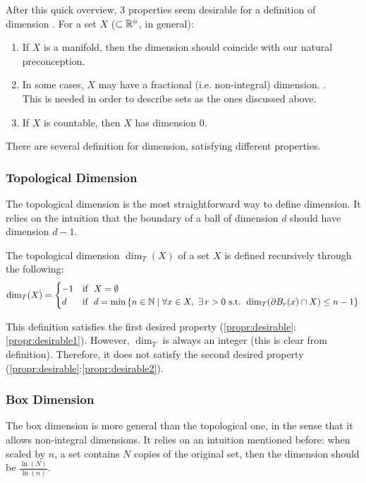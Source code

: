 After this quick overview, 3 properties seem desirable for a definition of dimension \cite{Pollicott_LFDT}.
For a set $X$ ($\subset \mathbb{R}^n$, in general):
\begin{enumerate}\label{propr:desirable}
	\item If $X$ is a manifold, then the dimension should coincide with our natural preconception. \label{propr:desirable1}
	\item In some cases, $X$ may have a fractional (i.e. non-integral) dimension. \label{propr:desirable2}.\\
	This is needed in order to describe sets as the ones discussed above.
	\item If $X$ is countable, then $X$ has dimension $0$. \label{propr:desirable3}
\end{enumerate}
There are several definition for dimension, satisfying different properties.

\subsubsection{Topological Dimension}
The topological dimension is the most straightforward way to define dimension.
It relies on the intuition that the boundary of a ball of dimension $d$ should have dimension $d-1$.

\begin{definition}\label{def:topologicalDimension}
	The topological dimension $\dim_T(X)$ of a set $X$ is defined recursively through the following:
	\begin{equation*}
		\dim_T(X) =
		\begin{cases}
			-1 & \text{if } \ X = \emptyset \\
			 d & \text{if } \ d = \min \left\lbrace n \in \mathbb{N} \mid \forall x \in X, \ \exists \, r>0 \text{ s.t. } \dim_T(\partial B_r(x) \cap X) \leq n-1 \right\rbrace
		\end{cases}
	\end{equation*}
\end{definition}

This definition satisfies the first desired property (\ref{propr:desirable}:\ref{propr:desirable1}).
However, $\dim_T$ is always an integer (this is clear from definition).
Therefore, it does not satisfy the second desired property (\ref{propr:desirable}:\ref{propr:desirable2}).

\subsubsection{Box Dimension}
The box dimension is more general than the topological one, in the sense that it allows non-integral dimensions.
It relies on an intuition mentioned before: when scaled by $n$, a set contains $N$ copies of the original set, then the dimension should be  $\frac{\ln(N)}{\ln(n)}$.

